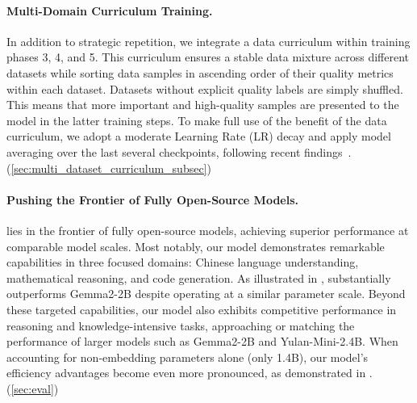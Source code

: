 \paragraph{Multi-Domain Curriculum Training.}
In addition to strategic repetition, we integrate a data curriculum within training phases 3, 4, and 5. This curriculum ensures a stable data mixture across different datasets while sorting data samples in ascending order of their quality metrics within each dataset. Datasets without explicit quality labels are simply shuffled. This means that more important and high-quality samples are presented to the model in the latter training steps. To make full use of the benefit of the data curriculum, we adopt a moderate Learning Rate (LR) decay and apply model averaging over the last several checkpoints, following recent findings~\citep{luo2025learningratedecaywastes}. (\cref{sec:multi_dataset_curriculum_subsec})

\paragraph{Pushing the Frontier of Fully Open-Source Models.} 
\sys lies in the frontier of fully open-source models, achieving superior performance at comparable model scales. 
Most notably, our model demonstrates remarkable capabilities in three focused domains: Chinese language understanding, mathematical reasoning, and code generation. 
As illustrated in , \sys substantially outperforms Gemma2-2B despite operating at a similar parameter scale. 
Beyond these targeted capabilities, our model also exhibits competitive performance in reasoning and knowledge-intensive tasks, approaching or matching the performance of larger models such as Gemma2-2B and Yulan-Mini-2.4B. 
When accounting for non-embedding parameters alone (only 1.4B), our model's efficiency advantages become even more pronounced, as demonstrated in . (\cref{sec:eval})


